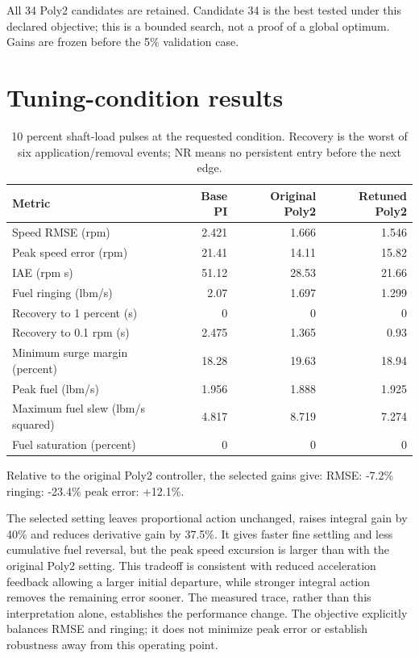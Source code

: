 \documentclass[11pt,a4paper]{article}
\begin{document}
All 34 Poly2 candidates are retained. Candidate 34 is the best tested under this declared objective; this is a bounded search, not a proof of a global optimum. Gains are frozen before the 5\% validation case.
\clearpage
\section{Tuning-condition results}
\begin{table}[H]\centering\small\begin{tabular}{lrrr}\toprule
Metric & Base PI & Original Poly2 & Retuned Poly2\\\midrule
Speed RMSE (rpm) & 2.421 & 1.666 & 1.546\\
Peak speed error (rpm) & 21.41 & 14.11 & 15.82\\
IAE (rpm s) & 51.12 & 28.53 & 21.66\\
Fuel ringing (lbm/s) & 2.07 & 1.697 & 1.299\\
Recovery to 1 percent (s) & 0 & 0 & 0\\
Recovery to 0.1 rpm (s) & 2.475 & 1.365 & 0.93\\
Minimum surge margin (percent) & 18.28 & 19.63 & 18.94\\
Peak fuel (lbm/s) & 1.956 & 1.888 & 1.925\\
Maximum fuel slew (lbm/s squared) & 4.817 & 8.719 & 7.274\\
Fuel saturation (percent) & 0 & 0 & 0\\
\bottomrule\end{tabular}\caption{10 percent shaft-load pulses at the requested condition. Recovery is the worst of six application/removal events; NR means no persistent entry before the next edge.}\end{table}
Relative to the original Poly2 controller, the selected gains give: RMSE: -7.2\% ringing: -23.4\% peak error: +12.1\%.

The selected setting leaves proportional action unchanged, raises integral gain by 40\% and reduces derivative gain by 37.5\%. It gives faster fine settling and less cumulative fuel reversal, but the peak speed excursion is larger than with the original Poly2 setting. This tradeoff is consistent with reduced acceleration feedback allowing a larger initial departure, while stronger integral action removes the remaining error sooner. The measured trace, rather than this interpretation alone, establishes the performance change. The objective explicitly balances RMSE and ringing; it does not minimize peak error or establish robustness away from this operating point.
\end{document}
